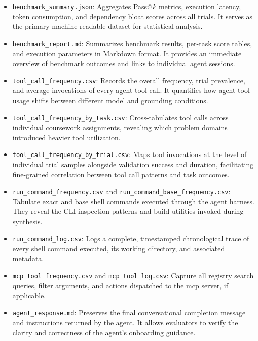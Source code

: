 \begin{itemize}
	\item \texttt{benchmark\_summary.json}: Aggregates Pass@$k$ metrics, execution
	      latency, token consumption, and dependency bloat scores across all trials.
	      It serves as the primary machine-readable dataset for statistical
	      analysis.

	\item \texttt{benchmark\_report.md}: Summarizes benchmark results, per-task
	      score tables, and execution parameters in Markdown format. It provides
	      an immediate overview of benchmark outcomes and links to individual
	      agent sessions.

	\item \texttt{tool\_call\_frequency.csv}: Records the overall frequency,
	      trial prevalence, and average invocations of every agent tool call. It
	      quantifies how agent tool usage shifts between different model and
	      grounding conditions.

	\item \texttt{tool\_call\_frequency\_by\_task.csv}: Cross-tabulates tool calls
	      across individual coursework assignments, revealing which problem
	      domains introduced heavier tool utilization.

	\item \texttt{tool\_call\_frequency\_by\_trial.csv}: Maps tool invocations at
	      the level of individual trial samples alongside validation success and duration,
	      facilitating fine-grained correlation between tool call patterns and
	      task outcomes.

	\item \texttt{run\_command\_frequency.csv} and \texttt{run\_command\_base\_frequency.csv}:
	      Tabulate exact and base shell commands executed through the agent
	      harness. They reveal the CLI inspection patterns and build utilities invoked
	      during synthesis.

	\item \texttt{run\_command\_log.csv}: Logs a complete, timestamped
	      chronological trace of every shell command executed, its working directory,
	      and associated metadata.

	\item \texttt{mcp\_tool\_frequency.csv} and \texttt{mcp\_tool\_log.csv}:
	      Capture all registry search queries, filter arguments, and actions
	      dispatched to the mcp server, if applicable.

	\item \texttt{agent\_response.md}: Preserves the final conversational completion
	      message and instructions returned by the agent. It allows evaluators to
	      verify the clarity and correctness of the agent's onboarding guidance.


\end{itemize}
